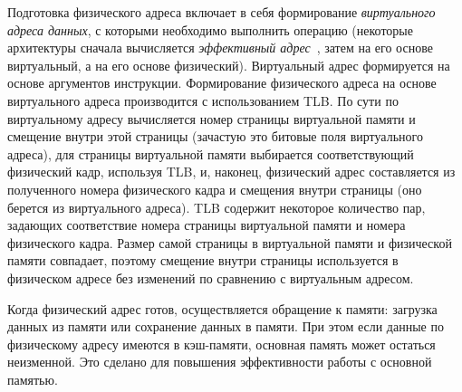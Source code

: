 Подготовка физического адреса включает в себя формирование
\emph{виртуального адреса данных}, с которыми необходимо выполнить
операцию (некоторые архитектуры сначала вычисляется
\emph{эффективный адрес}~\cite{PowerPC750}, затем на его основе
виртуальный, а на его основе физический). Виртуальный адрес
формируется на основе аргументов инструкции. Формирование
физического адреса на основе виртуального адреса производится с
использованием TLB. По сути по виртуальному адресу вычисляется номер
страницы виртуальной памяти и смещение внутри этой страницы
(зачастую это битовые поля виртуального адреса), для страницы
виртуальной памяти выбирается соответствующий физический кадр,
используя TLB, и, наконец, физический адрес составляется из
полученного номера физического кадра и смещения внутри страницы (оно
берется из виртуального адреса). TLB содержит некоторое количество
пар, задающих соответствие номера страницы виртуальной памяти и
номера физического кадра. Размер самой страницы в виртуальной памяти
и физической памяти совпадает, поэтому смещение внутри страницы
используется в физическом адресе без изменений по сравнению с
виртуальным адресом.

Когда физический адрес готов, осуществляется обращение к памяти:
загрузка данных из памяти или сохранение данных в памяти. При этом
если данные по физическому адресу имеются в кэш-памяти, основная
память может остаться неизменной. Это сделано для повышения
эффективности работы с основной памятью.


